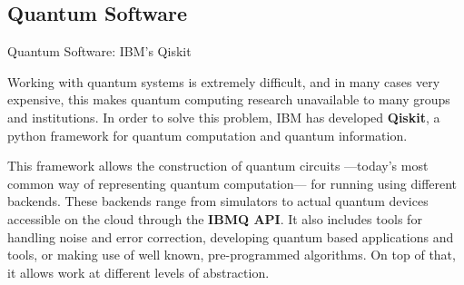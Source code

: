 \documentclass[9pt, handout, aspectratio=169]{beamer}		%
\begin{document}

	\subsection{Quantum Software}

	\begin{frame}{Quantum Software: IBM's Qiskit}

		\medskip

		Working with quantum systems is extremely difficult, and in many cases very expensive, this makes quantum computing research unavailable to many groups and institutions. In order to solve this problem, IBM has developed \textbf{Qiskit}, a python framework for quantum computation and quantum information.

		\begin{multicols}{2}

			This framework allows the construction of quantum circuits ---today's most common way of representing quantum computation--- for running using different backends. These backends range from simulators to actual quantum devices accessible on the cloud through the \textbf{IBMQ API}. It also includes tools for handling noise and error correction, developing quantum based applications and tools, or making use of well known, pre-programmed algorithms. On top of that, it allows work at different levels of abstraction.

			\columnbreak


\end{multicols}
\end{frame}
\end{document}
